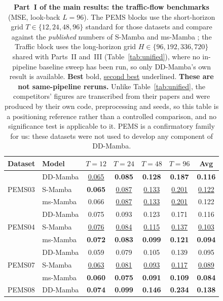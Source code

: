 \documentclass[review,12pt]{elsarticle}
\newcommand{\model}{DD-Mamba}
\newcommand{\best}[1]{\textcolor{cBest}{\textbf{#1}}}
\newcommand{\second}[1]{\textcolor{cSecond}{\underline{#1}}}
\begin{document}
\begin{table}[tb]
\centering
\caption{\textbf{Part~I of the main results: the traffic-flow benchmarks}
(MSE, look-back $L{=}96$). The PEMS blocks use the short-horizon grid
$T\in\{12,24,48,96\}$ standard for those datasets and compare against the
\emph{published} numbers of S-Mamba \cite{smamba} and ms-Mamba
\cite{msmamba}; the Traffic block uses the long-horizon grid
$H\in\{96,192,336,720\}$ shared with Parts~II and~III
(Table~\ref{tab:unified}), where no in-pipeline baseline sweep has been run,
so only \model{}'s own result is available. \best{Best} bold,
\second{second best} underlined. \textbf{These are not same-pipeline reruns.}
Unlike Table~\ref{tab:unified}, the competitors' figures are transcribed from
their papers and were produced by their own code, preprocessing and seeds, so
this table is a positioning reference rather than a controlled comparison,
and no significance test is applicable to it. PEMS is a confirmatory family
for us: these datasets were not used to develop any component of \model{}.}
\label{tab:pems}
\scriptsize
\setlength{\tabcolsep}{4pt}
\begin{tabular}{@{}ll cccc c@{}}
\toprule
Dataset & Model & $T{=}12$ & $T{=}24$ & $T{=}48$ & $T{=}96$ & Avg \\
\midrule
\multirow{3}{*}{PEMS03}
 & \model{} & \second{0.065} & \best{0.085} & \best{0.128} & \best{0.187} & \best{0.116} \\
 & S-Mamba & \best{0.065} & \second{0.087} & \second{0.133} & \second{0.201} & \second{0.122} \\
 & ms-Mamba & 0.066 & \second{0.087} & \second{0.133} & \second{0.201} & 0.122 \\
\midrule
\multirow{3}{*}{PEMS04}
 & \model{} & 0.075 & 0.093 & 0.123 & 0.171 & 0.116 \\
 & S-Mamba & \second{0.076} & \second{0.084} & \second{0.115} & \second{0.137} & \second{0.103} \\
 & ms-Mamba & \best{0.072} & \best{0.083} & \best{0.099} & \best{0.121} & \best{0.094} \\
\midrule
\multirow{3}{*}{PEMS07}
 & \model{} & 0.059 & 0.079 & 0.105 & 0.139 & 0.095 \\
 & S-Mamba & \second{0.063} & \second{0.081} & \second{0.093} & \second{0.117} & \second{0.089} \\
 & ms-Mamba & \best{0.060} & \best{0.075} & \best{0.091} & \best{0.109} & \best{0.084} \\
\midrule
\multirow{3}{*}{PEMS08}
 & \model{} & \best{0.074} & \best{0.099} & \best{0.146} & \best{0.234} & \best{0.138} \\

\end{tabular}
\end{table}
\end{document}
